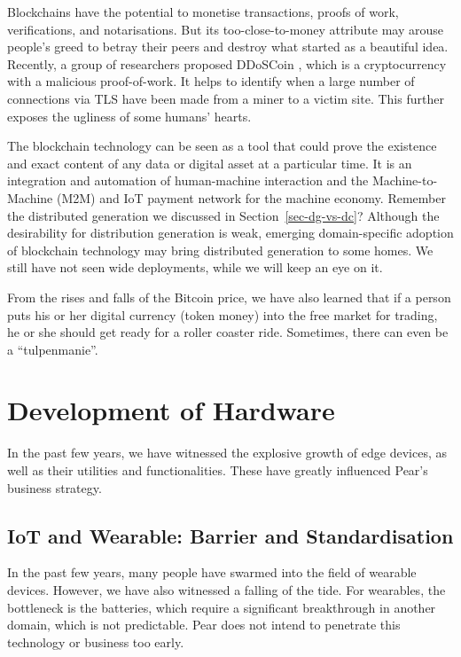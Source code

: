Blockchains have the potential to monetise transactions, proofs of work, verifications, and notarisations. But its too-close-to-money attribute may arouse people's greed to betray their peers and destroy what started as a beautiful idea. Recently, a group of researchers proposed DDoSCoin \cite{ddoscoin}, which is a cryptocurrency with a malicious proof-of-work. It helps to identify when a large number of connections via TLS have been made from a miner to a victim site. This further exposes the ugliness of some humans' hearts. 

The blockchain technology can be seen as a tool that could prove the existence and exact content of any data or digital asset at a particular time. It is an integration and automation of human-machine interaction and the Machine-to-Machine (M2M) and IoT payment network for the machine economy. Remember the distributed generation we discussed in Section~\ref{sec-dg-vs-dc}?  Although the desirability for distribution generation is weak, emerging domain-specific adoption of blockchain technology \cite{dg-blockchain} may bring distributed generation to some homes. We still have not seen wide deployments, while we will keep an eye on it.

From the rises and falls of the Bitcoin price, we have also learned that if a person puts his or her digital currency (token money) into the free market for trading, he or she should get ready for a roller coaster ride. Sometimes, there can even be a ``tulpenmanie''. 

\section{Development of Hardware}\label{sec-dev-hardware}
In the past few years, we have witnessed the explosive growth of edge devices, as well as their utilities and functionalities. These have greatly influenced Pear's business strategy. 

\subsection{IoT and Wearable: Barrier and Standardisation}
In the past few years, many people have swarmed into the field of wearable devices. However, we have also witnessed a falling of the tide.  
For wearables, the bottleneck is the batteries, which require a significant breakthrough in another domain, which is not predictable. Pear does not intend to penetrate this technology or business too early. 

